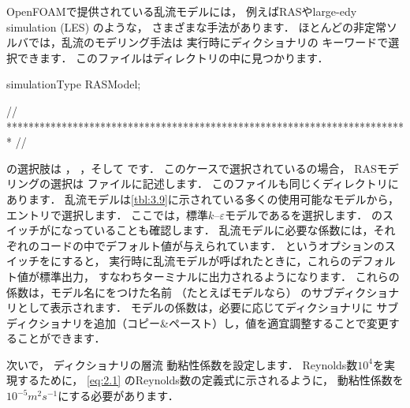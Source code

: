 OpenFOAMで提供されている乱流モデルには，
例えばRASやlarge-edy simulation (LES) のような，
さまざまな手法があります．
ほとんどの非定常ソルバでは，乱流のモデリング手法は
実行時にディクショナリの
キーワードで選択できます．
このファイルはディレクトリの中に見つかります．
\begin{OFverbatim}[file, linenum=17]

simulationType  RASModel;


// ************************************************************************* //
\end{OFverbatim}
の選択肢は
%
%
，
%
%
，そして
%
%
です．
このケースで選択されているの場合，
RASモデリングの選択は
%
%
ファイルに記述します．
このファイルも同じくディレクトリにあります．
乱流モデルは\autoref{tbl:3.9}に示されている多くの使用可能なモデルから，
エントリで選択します．
ここでは，標準$k$--$\varepsilon$モデルであるを選択します．
のスイッチがになっていることも確認します．
乱流モデルに必要な係数には，それぞれのコードの中でデフォルト値が与えられています．
%
%
というオプションのスイッチをにすると，
実行時に乱流モデルが呼ばれたときに，これらのデフォルト値が標準出力，
すなわちターミナルに出力されるようになります．
これらの係数は，モデル名にをつけた名前
（たとえばモデルなら）
のサブディクショナリとして表示されます．
モデルの係数は，必要に応じてディクショナリに
サブディクショナリを追加（コピー\&ペースト）し，値を適宜調整することで変更することができます．

次いで，
%
%
ディクショナリの層流
%
動粘性係数を設定します．
Reynolds数$10^{4}$を実現するために，
\autoref{eq:2.1} のReynolds数の定義式に示されるように，
動粘性係数を$10^{-5}\unit{m^{2}s^{-1}}$にする必要があります．


